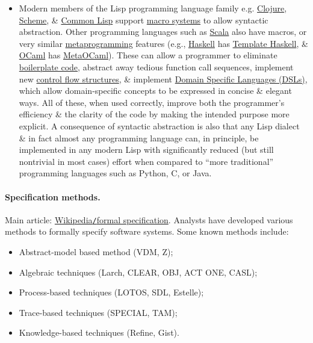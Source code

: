 \documentclass{article}
\begin{document}
\begin{itemize}
	\item Modern members of the Lisp programming language family e.g. \href{https://en.wikipedia.org/wiki/Clojure}{Clojure}, \href{https://en.wikipedia.org/wiki/Scheme_(programming_language)}{Scheme}, \& \href{https://en.wikipedia.org/wiki/Common_Lisp}{Common Lisp} support \href{https://en.wikipedia.org/wiki/Macro_(computer_science)#Syntactic_macros}{macro systems} to allow syntactic abstraction. Other programming languages such as \href{https://en.wikipedia.org/wiki/Scala_(programming_language)}{Scala} also have macros, or very similar \href{https://en.wikipedia.org/wiki/Metaprogramming}{metaprogramming} features (e.g., \href{https://en.wikipedia.org/wiki/Haskell_(programming_language)}{Haskell} has \href{https://en.wikipedia.org/wiki/Template_Haskell}{Template Haskell}, \& \href{https://en.wikipedia.org/wiki/OCaml}{OCaml} has \href{https://en.wikipedia.org/wiki/MetaOCaml}{MetaOCaml}). These can allow a programmer to eliminate \href{https://en.wikipedia.org/wiki/Boilerplate_code}{boilerplate code}, abstract away tedious function call sequences, implement new \href{https://en.wikipedia.org/wiki/Control_flow}{control flow structures}, \& implement \href{https://en.wikipedia.org/wiki/Domain-specific_language}{Domain Specific Languages (DSLs)}, which allow domain-specific concepts to be expressed in concise \& elegant ways. All of these, when used correctly, improve both the programmer's efficiency \& the clarity of the code by making the intended purpose more explicit. A consequence of syntactic abstraction is also that any Lisp dialect \& in fact almost any programming language can, in principle, be implemented in any modern Lisp with significantly reduced (but still nontrivial in most cases) effort when compared to ``more traditional'' programming languages such as Python, C, or Java.
\end{itemize}

\paragraph{Specification methods.} Main article: \href{https://en.wikipedia.org/wiki/Formal_specification}{Wikipedia{\tt/}formal specification}. Analysts have developed various methods to formally specify software systems. Some known methods include:
\begin{itemize}
	\item Abstract-model based method (VDM, Z);
	\item Algebraic techniques (Larch, CLEAR, OBJ, ACT ONE, CASL);
	\item Process-based techniques (LOTOS, SDL, Estelle);
	\item Trace-based techniques (SPECIAL, TAM);
	\item Knowledge-based techniques (Refine, Gist).
\end{itemize}
\end{document}
